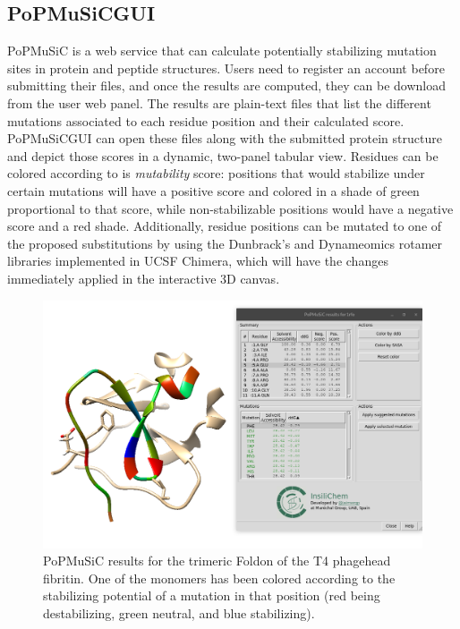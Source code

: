 \subsection{PoPMuSiCGUI}
PoPMuSiC\cite{dehouck2011popmusic} is a web service that can calculate potentially stabilizing mutation sites in protein and peptide structures. Users need to register an account before submitting their files, and once the results are computed, they can be download from the user web panel. The results are plain-text files that list the different mutations associated to each residue position and their calculated score. PoPMuSiCGUI can open these files along with the submitted protein structure and depict those scores in a dynamic, two-panel tabular view. Residues can be colored according to is \textit{mutability} score: positions that would stabilize under certain mutations will have a positive score and colored in a shade of green proportional to that score, while non-stabilizable positions would have a negative score and a red shade. Additionally, residue positions can be mutated to one of the proposed substitutions by using the Dunbrack's\cite{dunbrack1993backbone} and Dynameomics\cite{scouras2011dynameomics} rotamer libraries implemented in UCSF Chimera, which will have the changes immediately applied in the interactive 3D canvas.



\begin{figure}
	\begin{Center}
		\includegraphics[width=\textwidth]{./figures/05/tangram_popmusic.png}
	\end{Center}
	\cprotect\caption[Tangram PoPMuSiC GUI]{PoPMuSiC results for the trimeric Foldon of the T4 phagehead fibritin.\cite{1rfo} One of the monomers has been colored according to the stabilizing potential of a mutation in that position (red being destabilizing, green neutral, and blue stabilizing).}
	\label{fig:tangram-popmusic}
\end{figure}


